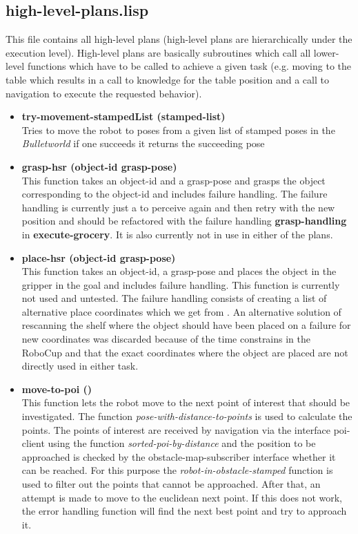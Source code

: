 \documentclass[main.tex]{subfiles}
\begin{document}
        \subsection{high-level-plans.lisp}
        \label{high-level}
        This file contains all high-level plans (high-level plans are hierarchically under the execution level). High-level plans are basically subroutines which call all lower-level functions which have to be called to achieve a given task (e.g. moving to the table which results in a call to knowledge for the table position and a call to navigation to execute the requested behavior).
        \begin{itemize}
        \item \textbf{try-movement-stampedList (stamped-list)} \\
        Tries to move the robot to poses from a given list of stamped poses in the \textit{Bulletworld} if one succeeds it returns the succeeding pose 
        \item \textbf{grasp-hsr (object-id grasp-pose)} \\
        This function takes an object-id and a grasp-pose and grasps the object corresponding to the object-id and includes failure handling. The failure handling is currently just a to perceive again and then retry with the new position and should be refactored with the failure handling \textbf{grasp-handling} in \textbf{execute-grocery}.
        It is also currently not in use in either of the plans.
        \item \textbf{place-hsr (object-id grasp-pose)} \\
        This function takes an object-id, a grasp-pose and places the object in the gripper in the goal and includes failure handling. This function is currently not used and untested. The failure handling consists of creating a list of alternative place coordinates which we get from . An alternative solution of rescanning the shelf where the object should have been placed on a failure for new coordinates was discarded because of the time constrains in the RoboCup and that the exact coordinates where the object are placed are not directly used in either task. 
        \item \textbf{move-to-poi ()} \\
        This function lets the robot move to the next point of interest that should be investigated. The function \textit{pose-with-distance-to-points} is used to calculate the points. The points of interest are received by navigation via the interface poi-client using the function \textit{sorted-poi-by-distance} and the position to be approached is checked by the obstacle-map-subscriber interface whether it can be reached. For this purpose the \textit{robot-in-obstacle-stamped} function is used to filter out the points that cannot be approached. After that, an attempt is made to move to the euclidean next point. If this does not work, the error handling function will find the next best point and try to approach it.

\end{itemize}
\end{document}
